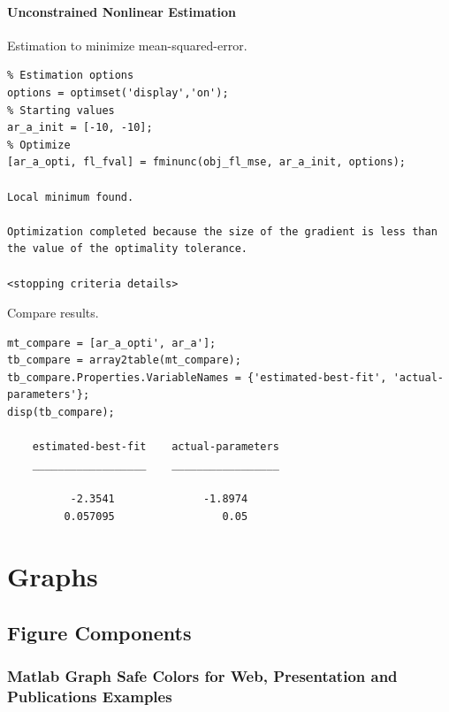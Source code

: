 \documentclass[
]{book}
\begin{document}
\hypertarget{unconstrained-nonlinear-estimation}{%
\subsubsection{Unconstrained Nonlinear Estimation}\label{unconstrained-nonlinear-estimation}}

Estimation to minimize mean-squared-error.

\begin{verbatim}
% Estimation options
options = optimset('display','on');
% Starting values
ar_a_init = [-10, -10];
% Optimize
[ar_a_opti, fl_fval] = fminunc(obj_fl_mse, ar_a_init, options);

Local minimum found.

Optimization completed because the size of the gradient is less than
the value of the optimality tolerance.

<stopping criteria details>
\end{verbatim}

Compare results.

\begin{verbatim}
mt_compare = [ar_a_opti', ar_a'];
tb_compare = array2table(mt_compare);
tb_compare.Properties.VariableNames = {'estimated-best-fit', 'actual-parameters'};
disp(tb_compare);

    estimated-best-fit    actual-parameters
    __________________    _________________

          -2.3541              -1.8974     
         0.057095                 0.05     
\end{verbatim}

\hypertarget{graphs}{%
\chapter{Graphs}\label{graphs}}

\hypertarget{figure-components}{%
\section{Figure Components}\label{figure-components}}

\hypertarget{matlab-graph-safe-colors-for-web-presentation-and-publications-examples}{%
\subsection{Matlab Graph Safe Colors for Web, Presentation and Publications Examples}\label{matlab-graph-safe-colors-for-web-presentation-and-publications-examples}}
\end{document}

